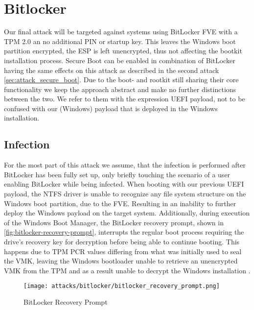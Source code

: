 \section{Bitlocker}

Our final attack will be targeted against systems using BitLocker \ac{FVE} with a \ac{TPM} 2.0 an no additional PIN or startup key. This leaves the Windows boot partition encrypted, the \ac{ESP} is left unencrypted, thus not affecting the bootkit installation process. Secure Boot can be enabled in combination of BitLocker having the same effects on this attack as described in the second attack \autoref{sec:attack_secure_boot}. Due to the boot- and rootkit still sharing their core functionality we keep the approach abstract and make no further distinctions between the two. We refer to them with the expression \ac{UEFI} payload, not to be confused with our (Windows) payload that is deployed in the Windows installation.

\subsection{Infection}

For the most part of this attack we assume, that the infection is performed after BitLocker has been fully set up, only briefly touching the scenario of a user enabling BitLocker while being infected. When booting with our previous \ac{UEFI} payload, the \ac{NTFS} driver is unable to recognize any file system structure  on the Windows boot partition, due to the \ac{FVE}. Resulting in an inability to further deploy the Windows payload on the target system. Additionally, during execution of the Windows Boot Manager, the BitLocker recovery prompt, shown in \autoref{fig:bitlocker-recovery-prompt}, interrupts the regular boot process requiring the drive's recovery key for decryption before being able to continue booting.
This happens due to \ac{TPM} \ac{PCR} values differing from what was initially used to seal the \ac{VMK}, leaving the Windows bootloader unable to retrieve an unencrypted \ac{VMK} from the \ac{TPM} and as a result unable to decrypt the Windows installation \cite[12.]{windows-internals-7-part2}.

\begin{figure}[htb]%
    \centering
    \texttt{[image: attacks/bitlocker/bitlocker\_recovery\_prompt.png]}%
    \caption{BitLocker Recovery Prompt}%
    \label{fig:bitlocker-recovery-prompt}%
\end{figure}

